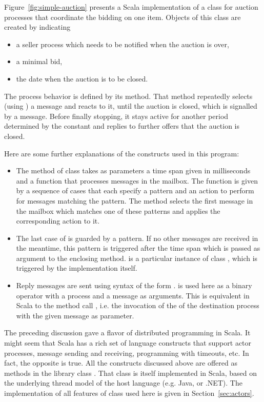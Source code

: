 \documentclass[a4paper,12pt,twoside,titlepage]{book}
\begin{document}
Figure~\ref{fig:simple-auction} presents a Scala implementation of a
class  for auction processes that coordinate the bidding
on one item. Objects of this class are created by indicating
\begin{itemize}
\item a seller process which needs to be notified when the auction is over,
\item a minimal bid,
\item the date when the auction is to be closed.
\end{itemize}
The process behavior is defined by its  method. That method
repeatedly selects (using ) a message and reacts to it,
until the auction is closed, which is signalled by a 
message. Before finally stopping, it stays active for another period
determined by the  constant and replies to
further offers that the auction is closed.  

Here are some further explanations of the constructs used in this
program:
\begin{itemize}
\item
The  method of class  takes as
parameters a time span given in milliseconds and a function that
processes messages in the mailbox. The function is given by a sequence
of cases that each specify a pattern and an action to perform for
messages matching the pattern. The  method selects
the first message in the mailbox which matches one of these patterns
and applies the corresponding action to it.
\item
The last case of  is guarded by a
 pattern. If no other messages are received in the meantime, this
pattern is triggered after the time span which is passed as argument
to the enclosing  method.  is a
particular instance of class , which is triggered by the
 implementation itself.
\item
Reply messages are sent using syntax of the form
.  is used here as a
binary operator with a process and a message as arguments. This is
equivalent in Scala to the method call
, i.e. the invocation of
the  of the destination process with the given message as
parameter.
\end{itemize}
The preceding discussion gave a flavor of distributed programming in
Scala. It might seem that Scala has a rich set of language constructs
that support actor processes, message sending and receiving,
programming with timeouts, etc. In fact, the opposite is true. All the
constructs discussed above are offered as methods in the library class
. That class is itself implemented in Scala, based on the underlying 
thread model of the host language (e.g. Java, or .NET).
The implementation of all features of class  used here is
given in Section~\ref{sec:actors}.
\end{document}

